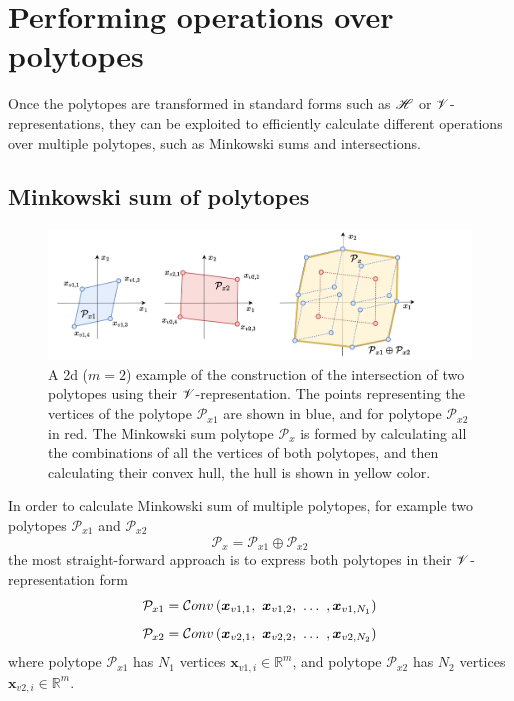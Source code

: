 
\section{Performing operations over polytopes}
\label{ch:operations_over_poly_stategies}

Once the polytopes are transformed in standard forms such as $\mathscr{H}$ or $\mathscr{V}$-representations, they can be exploited to efficiently calculate different operations over multiple polytopes, such as Minkowski sums  and intersections.

\subsection{Minkowski sum of polytopes}
\begin{figure}[!h]
    \centering
    \includegraphics[width=0.9\linewidth]{Chapters/imgs/polytope_minkowski_sum.pdf}
    \caption{A 2d ($m\!=\!2$) example of the construction of the intersection of two polytopes using their $\mathscr{V}$-representation. The points representing the vertices of the polytope $\mathcal{P}_{x1}$ are shown in blue, and for polytope $\mathcal{P}_{x2}$ in red. The Minkowski sum polytope $\mathcal{P}_x$ is formed by calculating all the combinations of all the vertices of both polytopes, and then calculating their convex hull, the hull is shown in yellow color.}
    \label{fig:collab_sum_solution}
\end{figure}

In order to calculate Minkowski sum of multiple polytopes, for example two polytopes $\mathcal{P}_{x1}$ and $ \mathcal{P}_{x2}$
\begin{equation}
    \mathcal{P}_x = \mathcal{P}_{x1} \oplus \mathcal{P}_{x2}
\end{equation}
the most straight-forward approach is to express both polytopes in their $\mathscr{V}$-representation form
\begin{equation}
    \mathcal{P}_{x1} = \mathcal{C}onv\left(\bm{x}_{v1,1},~\bm{x}_{v1,2},~\ldots~,\bm{x}_{v1,N_1}\right)
\end{equation}
\begin{equation}
    \mathcal{P}_{x2} =  \mathcal{C}onv\left(\bm{x}_{v2,1},~\bm{x}_{v2, 2},~\ldots~,\bm{x}_{v2,N_2}\right)
\end{equation}
where polytope $\mathcal{P}_{x1}$ has $N_1$ vertices $\bm{x}_{v1,i}\in \mathbb{R}^m$, and polytope $\mathcal{P}_{x2}$ has $N_2$ vertices $\bm{x}_{v2,i}\in \mathbb{R}^m$.


